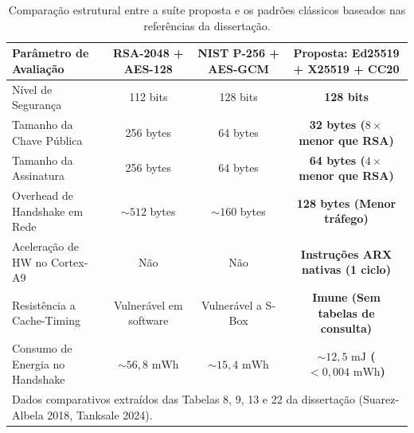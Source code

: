 \begin{table}[htbp]
\centering
\caption{Comparação estrutural entre a suíte proposta e os padrões clássicos baseados nas referências da dissertação.}
\label{tab:comparativo_estrutural_literatura}
\begin{tabular}{lccc}
\hline
\textbf{Parâmetro de Avaliação} & \textbf{RSA-2048 + AES-128} & \textbf{NIST P-256 + AES-GCM} & \textbf{Proposta: Ed25519 + X25519 + CC20} \\
\hline
Nível de Segurança & 112 bits & 128 bits & \textbf{128 bits} \\
Tamanho da Chave Pública & 256 bytes & 64 bytes & \textbf{32 bytes ($8\times$ menor que RSA)} \\
Tamanho da Assinatura & 256 bytes & 64 bytes & \textbf{64 bytes ($4\times$ menor que RSA)} \\
Overhead de Handshake em Rede & $\sim 512$ bytes & $\sim 160$ bytes & \textbf{128 bytes (Menor tráfego)} \\
Aceleração de HW no Cortex-A9 & Não & Não & \textbf{Instruções ARX nativas (1 ciclo)} \\
Resistência a Cache-Timing & Vulnerável em software & Vulnerável a S-Box & \textbf{Imune (Sem tabelas de consulta)} \\
Consumo de Energia no Handshake & $\sim 56{,}8\text{ mWh}$ & $\sim 15{,}4\text{ mWh}$ & \textbf{$\sim 12{,}5\text{ mJ}$ ($< 0{,}004\text{ mWh}$)} \\
\hline
\multicolumn{4}{l}{\footnotesize Dados comparativos extraídos das Tabelas 8, 9, 13 e 22 da dissertação (Suarez-Albela 2018, Tanksale 2024).} \\
\end{tabular}
\end{table}

